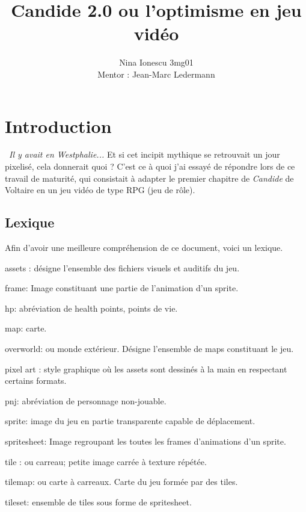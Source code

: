 \documentclass[11pt]{article}
\begin{document}
\title{Candide 2.0 ou l'optimisme en jeu vidéo }
\author{Nina Ionescu 3mg01 \\ Mentor : Jean-Marc Ledermann}
\date{}

\maketitle

\newpage
\tableofcontents
\newpage
{}
\section{Introduction}\
\textit {Il y avait en Westphalie...} Et si cet incipit mythique se retrouvait un jour pixelisé, cela donnerait quoi ? C'est ce à quoi j'ai essayé de répondre lors de ce travail de maturité, qui consistait à adapter le premier chapitre de \textit{Candide} de Voltaire en un jeu vidéo de type RPG (jeu de rôle).
\subsection{Lexique}
Afin d'avoir une meilleure compréhension de ce document, voici un lexique. \\
\begin{list}{}{}
\item assets : désigne l'ensemble des fichiers visuels et auditifs du jeu.
\item frame: Image constituant une partie de l'animation d'un sprite.
\item hp: abréviation de health points, points de vie.
\item map: carte.
\item overworld: ou monde extérieur. Désigne l'ensemble de maps constituant le jeu.
\item pixel art : style graphique où les assets sont dessinés à la main en respectant certains formats.
\item pnj: abréviation de personnage non-jouable.
\item sprite: image du jeu en partie transparente capable de déplacement.
\item spritesheet: Image regroupant les toutes les frames d'animations d'un sprite.
\item tile : ou carreau; petite image carrée à texture répétée.
\item tilemap: ou carte à carreaux. Carte du jeu formée par des tiles.
\item tileset: ensemble de tiles sous forme de spritesheet.
\end{list}
\end{document}
